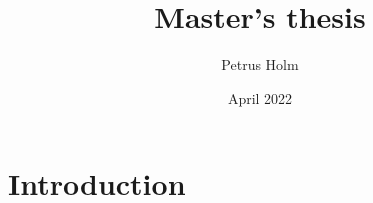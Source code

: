 \documentclass{article}
\title{Master's thesis}
\author{Petrus Holm}
\date{April 2022}
\begin{document}
\maketitle

\section{Introduction}
\end{document}
